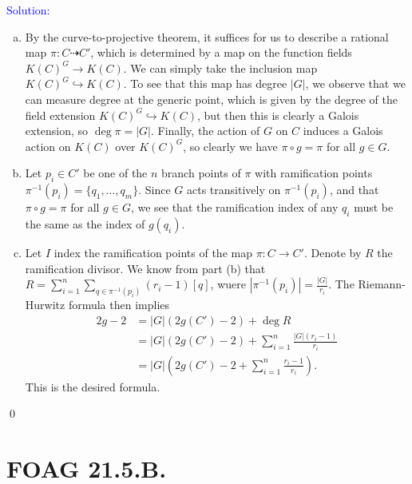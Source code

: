 \documentclass[11pt]{article}
\newenvironment{solution}{\begin{trivlist}\item[]{\textcolor{blue}{Solution:}}}{\qed \end{trivlist}}
\begin{document}
\begin{solution}
\begin{enumerate}[(a)]
    \item By the curve-to-projective theorem, it suffices for us to describe a rational map $\pi: C \dashrightarrow C'$, which is determined by a map on the function fields $K(C)^G \rightarrow K(C)$. We can simply take the inclusion map $K(C)^G \hookrightarrow K(C)$. To see that this map has degree $|G|$, we observe that we can measure degree at the generic point, which is given by the degree of the field extension $K(C)^G \hookrightarrow K(C)$, but then this is clearly a Galois extension, so $\deg \pi = |G|$. Finally, the action of $G$ on $C$ induces a Galois action on $K(C)$ over $K(C)^G$, so clearly we have $\pi \circ g = \pi$ for all $g \in G$. 
    
    \item Let $p_i \in C'$ be one of the $n$ branch points of $\pi$ with ramification points $\pi^{-1}(p_i) = \{q_1, \ldots, q_m\}$. Since $G$ acts transitively on $\pi^{-1}(p_i)$, and that $\pi \circ g = \pi$ for all $g \in G$, we see that the ramification index of any $q_i$ must be the same as the index of $g(q_i)$. 
    
    \item Let $I$ index the ramification points of the map $\pi: C \rightarrow C'$. Denote by $R$ the ramification divisor. We know from part (b) that $R = \sum_{i=1}^n \sum_{q \in \pi^{-1}(p_i)} (r_i-1)[q]$, wuere $|\pi^{-1}(p_i)| = \frac{|G|}{r_i}$. The Riemann-Hurwitz formula then implies 
    \begin{align*}
        2g - 2 
        &= |G| (2g(C') - 2) + \deg R \\
        &= |G| (2g(C') - 2) + \sum_{i=1}^n \frac{|G| (r_i - 1)}{r_i} \\
        &= |G| \left( 2g(C') - 2 + \sum_{i=1}^n \frac{r_i - 1}{r_i} \right).
    \end{align*}
    This is the desired formula. 
\end{enumerate}
\end{solution}

\newpage

\section*{FOAG 21.5.B.}
\end{document}
